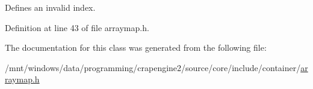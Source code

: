 Defines an invalid index. 



Definition at line 43 of file arraymap.\+h.



The documentation for this class was generated from the following file\+:\begin{DoxyCompactItemize}
\item 
/mnt/windows/data/programming/crapengine2/source/core/include/container/\hyperlink{arraymap_8h}{arraymap.\+h}\end{DoxyCompactItemize}
